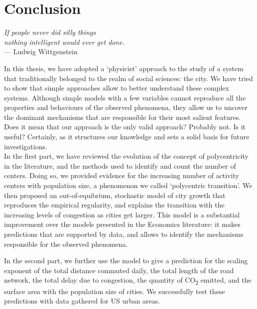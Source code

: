 %
\chapter{Conclusion}
\label{sec:conclusion}

\begin{flushright}{\slshape    
If people never did silly things\\
nothing intelligent would ever get done.} \\ \medskip
--- Ludwig Wittgenstein~\cite{Luckhardt:1979}
\end{flushright}

\bigskip

In this thesis, we have adopted a `physicist' approach to the study of a system
that traditionally belonged to the realm of social sciences: the city. We have
tried to show that simple approaches allow to better understand
these complex systems. Although simple models with a few variables cannot
reproduce all the properties and behaviours of the observed phenomena, they
allow us to uncover the dominant mechanisms that are responsible for their most
salient features. Does it mean that our approach is the only valid approach?
Probably not. Is it useful? Certainly, as it structures
our knowledge and sets a solid basis for future investigations.\\

In the first part, we have reviewed the evolution of the concept of
polycentricity in the literature, and the methods used to identify and count the
number of centers. Doing so, we provided evidence for the increasing number of
activity centers with population size, a phenomenon we called `polycentric
transition'. We then proposed an out-of-equibrium, stochastic model of
city growth that reproduces the empirical regularity, and explains the
transition with the increasing levels of congestion as cities get larger. This
model is a substantial improvement over the models presented in the Economics
literature: it makes predictions that are supported by data, and allows to
identify the mechanisms responsible for the observed phenomena. 

In the second part, we further use the model to give a prediction for the
scaling exponent of the total distance commuted daily, the total length of the
road network, the total delay due to congestion, the quantity of
CO\textsubscript{2} emitted, and the surface area with the population size of
cities. We successfully test these predictions with data gathered for US urban
areas.

